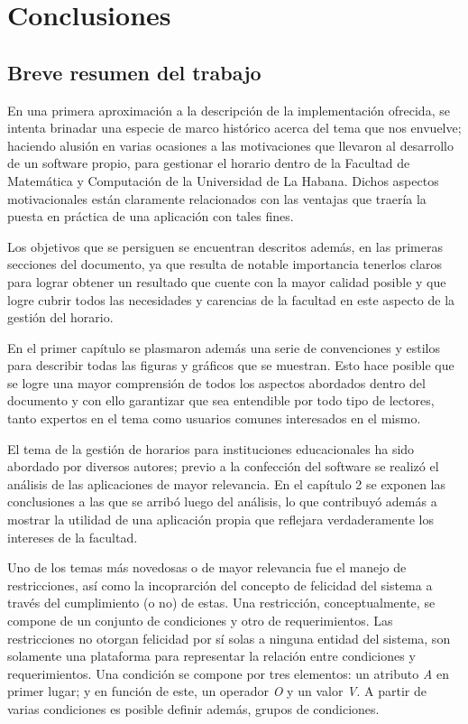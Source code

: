 \chapter{Conclusiones}

\section{Breve resumen del trabajo}

En una primera aproximación a la descripción de la implementación ofrecida, se intenta brinadar una especie de marco histórico acerca del tema que nos envuelve; haciendo alusión en varias ocasiones a las motivaciones que llevaron al desarrollo de un software propio, para gestionar el horario dentro de la Facultad de Matemática y Computación de la Universidad de La Habana. Dichos aspectos motivacionales están claramente relacionados con las ventajas que traería la puesta en práctica de una aplicación con tales fines. 

Los objetivos que se persiguen se encuentran descritos además, en las primeras secciones del documento, ya que resulta de notable importancia tenerlos claros para lograr obtener un resultado que cuente con la mayor calidad posible y que logre cubrir todos las necesidades y carencias de la facultad en este aspecto de la gestión del horario. 

En el primer capítulo se plasmaron además una serie de convenciones y estilos para describir todas las figuras y gráficos que se muestran. Esto hace posible que se logre una mayor comprensión de todos los aspectos abordados dentro del documento y con ello garantizar que sea entendible por todo tipo de lectores, tanto expertos en el tema como usuarios comunes interesados en el mismo.

El tema de la gestión de horarios para instituciones educacionales ha sido abordado por diversos autores; previo a la confección del software se realizó el análisis de las aplicaciones de mayor relevancia. En el capítulo 2 se exponen las conclusiones a las que se arribó luego del análisis, lo que contribuyó además a mostrar la utilidad de una aplicación propia que reflejara verdaderamente los intereses de la facultad.

Uno de los temas más novedosas o de mayor relevancia fue el manejo de restricciones, así como la incoprarción del concepto de felicidad del sistema a través del cumplimiento (o no) de estas. Una restricción, conceptualmente, se compone de un conjunto de condiciones y otro de requerimientos.  Las restricciones no otorgan felicidad por sí solas a ninguna entidad del sistema, son solamente una plataforma para representar la relación entre condiciones y requerimientos.
Una condición se compone por tres elementos: un atributo \textit{A} en primer lugar; y en función de este, un operador \textit{O} y un valor \textit{V}. A partir de varias condiciones es posible definir además, grupos de
condiciones. 

